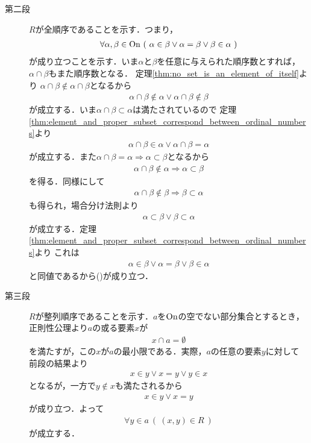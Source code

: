 \begin{prf}
\begin{description}
			\item[第二段]
				$R$が全順序であることを示す．つまり，
				\begin{align}
					\forall \alpha,\beta \in \ON\ 
					(\ \alpha \in \beta \vee \alpha = \beta \vee \beta \in \alpha\ )
					\label{eq:thm_On_is_wellordered_1}
				\end{align}
				が成り立つことを示す．いま$\alpha$と$\beta$を任意に与えられた順序数とすれば，
				$\alpha \cap \beta$もまた順序数となる．
				定理\ref{thm:no_set_is_an_element_of_itself}より
				$\alpha \cap \beta \notin \alpha \cap \beta$となるから
				\begin{align}
					\alpha \cap \beta \notin \alpha \vee
					\alpha \cap \beta \notin \beta
				\end{align}
				が成立する．いま$\alpha \cap \beta \subset \alpha$は満たされているので
				定理\ref{thm:element_and_proper_subset_correspond_between_ordinal_numbers}より
				\begin{align}
					\alpha \cap \beta \in \alpha \vee
					\alpha \cap \beta = \alpha
				\end{align}
				が成立する．また$\alpha \cap \beta = \alpha \Longrightarrow \alpha \subset \beta$となるから
				\begin{align}
					\alpha \cap \beta \notin \alpha
					\Longrightarrow \alpha \subset \beta
				\end{align}
				を得る．同様にして
				\begin{align}
					\alpha \cap \beta \notin \beta
					\Longrightarrow \beta \subset \alpha
				\end{align}
				も得られ，場合分け法則より
				\begin{align}
					\alpha \subset \beta \vee \beta \subset \alpha
				\end{align}
				が成立する．定理\ref{thm:element_and_proper_subset_correspond_between_ordinal_numbers}より
				これは
				\begin{align}
					\alpha \in \beta \vee \alpha = \beta \vee \beta \in \alpha
				\end{align}
				と同値であるから()が成り立つ．
			
			\item[第三段]
				$R$が整列順序であることを示す．$a$を$\mathrm{On}$の空でない部分集合とするとき，
				正則性公理より$a$の或る要素$x$が
				\begin{align}
					x \cap a = \emptyset
				\end{align}
				を満たすが，この$x$が$a$の最小限である．実際，$a$の任意の要素$y$に対して
				前段の結果より
				\begin{align}
					x \in y \vee x = y \vee y \in x
				\end{align}
				となるが，一方で$y \notin x$も満たされるから
				\begin{align}
					x \in y \vee x = y
				\end{align}
				が成り立つ．よって
				\begin{align}
					\forall y \in a\ (\ (x,y) \in R\ )
				\end{align}
				が成立する．
				\QED
		\end{description}
	\end{prf}
	
